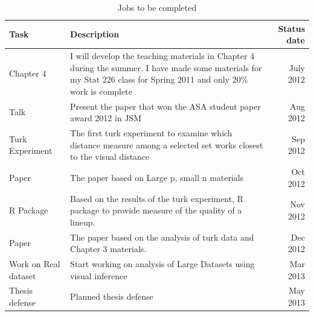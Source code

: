 \begin{table}[hbtp]
\caption{Jobs to be completed}
\centering 
\begin{tabular}{|l|p{10cm}|r|} 
\hline
Task &  Description & Status date\\ %
\hline
Chapter 4 & I will develop the teaching materials in Chapter 4 during the summer. I have made some materials for my Stat 226 class for Spring 2011 and only 20\% work is complete\vspace{.1in} & July 2012 \\
Talk & Present the paper that won the ASA student paper award 2012 in JSM \vspace{.1in} & Aug 2012\\
Turk Experiment & The first turk experiment to examine which distance measure among a selected set works closest to the visual distance  \vspace{.1in}& Sep 2012 \\
Paper & The paper based on Large p, small n materials \vspace{.1in} & Oct 2012 \\
R Package  & Based on the results of the turk experiment, R package to provide measure of the quality of a lineup.  \vspace{.1in} & Nov 2012\\
Paper & The paper based on the analysis of turk data and Chapter 3 materials. \vspace{.1in} & Dec 2012\\
Work on Real dataset & Start working on analysis of Large Datasets using visual inference \vspace{.1in}  & Mar 2013\\ 
Thesis defense & Planned thesis defense \vspace{.1in} & May 2013\\
\hline 
\end{tabular}
\label{tbl:tjob}
\end{table}	

